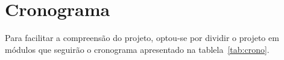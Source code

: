 \chapter{Cronograma}\label{cap:cronograma}

Para facilitar a compreensão do projeto, optou-se por dividir o projeto em módulos
que seguirão o cronograma apresentado na tablela~\ref{tab:crono}.

\begin{table}[ht]
  \caption{Cronograma --- {\footnotesize MMP: Modelagem do mapeamento; PVC: Prova de conceito;
      IMPARQ: Implementação da arquitetura; IMPALG: Implementação do Algoritmo; RED: Redação do
  texto; TST: Testes; DEF: Defesa; PR: Participação na Robocup}\label{tab:crono}}
\end{table}


